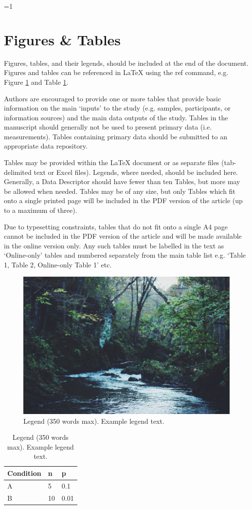 \documentclass[fleqn,10pt]{wlscirep}
\newcommand{\ifinstruction}{1} %
\begin{document}
\ifnum \ifinstruction=1
\section*{Figures \& Tables}


Figures, tables, and their legends, should be included at the end of the document. Figures and tables can be referenced in \LaTeX{} using the ref command, e.g. Figure \ref{fig:stream} and Table \ref{tab:example}. 

Authors are encouraged to provide one or more tables that provide basic information on the main ‘inputs’ to the study (e.g. samples, participants, or information sources) and the main data outputs of the study. Tables in the manuscript should generally not be used to present primary data (i.e. measurements). Tables containing primary data should be submitted to an appropriate data repository.

Tables may be provided within the \LaTeX{} document or as separate files (tab-delimited text or Excel files). Legends, where needed, should be included here. Generally, a Data Descriptor should have fewer than ten Tables, but more may be allowed when needed. Tables may be of any size, but only Tables which fit onto a single printed page will be included in the PDF version of the article (up to a maximum of three). 

Due to typesetting constraints, tables that do not fit onto a single A4 page cannot be included in the PDF version of the article and will be made available in the online version only. Any such tables must be labelled in the text as ‘Online-only’ tables and numbered separately from the main table list e.g. ‘Table 1, Table 2, Online-only Table 1’ etc.

\begin{figure}[ht]
\centering
\includegraphics[width=\linewidth]{stream}
\caption{Legend (350 words max). Example legend text.}
\label{fig:stream}
\end{figure}

\begin{table}[ht]
\centering
\begin{tabular}{|l|l|l|}
\hline
Condition & n & p \\
\hline
A & 5 & 0.1 \\
\hline
B & 10 & 0.01 \\
\hline
\end{tabular}
\caption{\label{tab:example}Legend (350 words max). Example legend text.}
\end{table}
\fi
\end{document}
